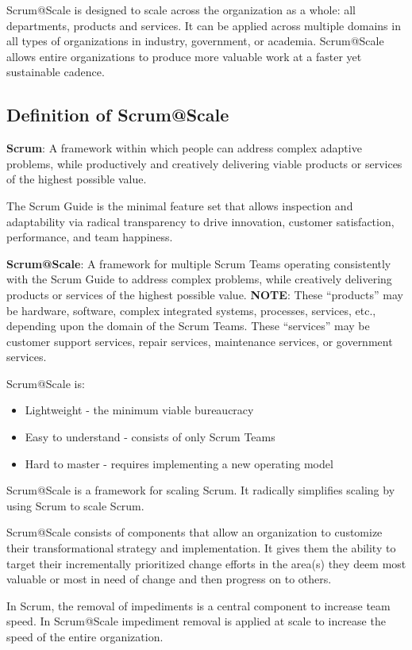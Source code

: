\documentclass[12pt,a4paper,parskip=full]{scrartcl}
\begin{document}
Scrum@Scale is designed to scale across the organization as a whole: all departments, products and services. It can be applied across multiple domains in all types of organizations in industry, government, or academia.  Scrum@Scale allows entire organizations to produce more valuable work at a faster yet sustainable cadence.

\subsection{Definition of Scrum@Scale}

\textbf{Scrum}: A framework within which people can address complex adaptive problems, while productively and creatively delivering viable products or services of the highest possible value.

The Scrum Guide is the minimal feature set that allows inspection and adaptability via radical transparency to drive innovation, customer satisfaction, performance, and team happiness.

\textbf{Scrum@Scale}: A framework for multiple Scrum Teams operating consistently with the Scrum Guide to address complex problems, while creatively delivering products or services of the highest possible value.
\textbf{NOTE}: These ``products'' may be hardware, software, complex integrated systems, processes, services, etc., depending upon the domain of the Scrum Teams.  These “services” may be customer support services, repair services, maintenance services, or government services.  

Scrum@Scale is:
\begin{itemize}
	\item Lightweight - the minimum viable bureaucracy
	\item Easy to understand - consists of only Scrum Teams
	\item Hard to master - requires implementing a new operating model
\end{itemize}

Scrum@Scale is a framework for scaling Scrum. It radically simplifies scaling by using Scrum to scale Scrum. 

Scrum@Scale consists of components that allow an organization to customize their transformational strategy and implementation. It gives them the ability to target their incrementally prioritized change efforts in the area(s) they deem most valuable or most in need of change and then progress on to others. 

In Scrum, the removal of impediments is a central component to increase team speed. In Scrum@Scale impediment removal is applied at scale to increase the speed of the entire organization.
\end{document}
